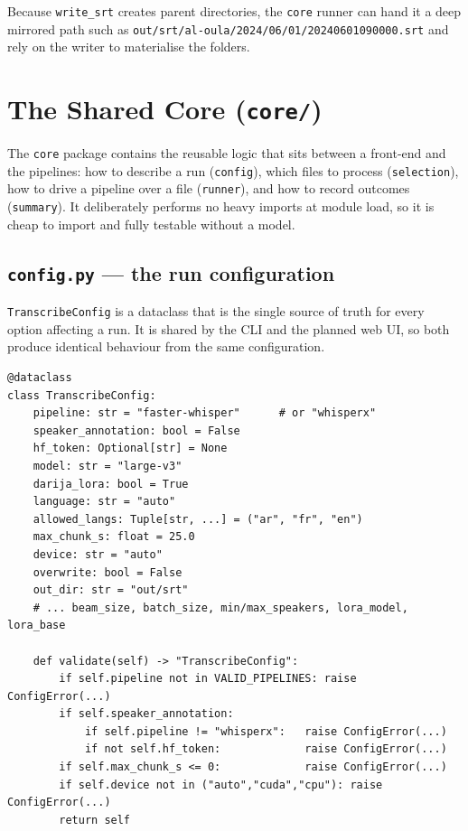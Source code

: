 \documentclass[11pt,a4paper]{report}
\newcommand{\code}[1]{\texttt{\small #1}}
\begin{document}
Because \code{write\_srt} creates parent directories, the \texttt{core} runner can
hand it a deep mirrored path such as
\code{out/srt/al-oula/2024/06/01/20240601090000.srt} and rely on the writer to
materialise the folders.

\chapter{The Shared Core (\texttt{core/})}
\label{ch:core}

The \texttt{core} package contains the reusable logic that sits between a
front-end and the pipelines: how to describe a run (\code{config}), which files to
process (\code{selection}), how to drive a pipeline over a file
(\code{runner}), and how to record outcomes (\code{summary}). It deliberately
performs no heavy imports at module load, so it is cheap to import and fully
testable without a model.

\section{\texttt{config.py} --- the run configuration}

\code{TranscribeConfig} is a dataclass that is the single source of truth for
every option affecting a run. It is shared by the CLI and the planned web UI, so
both produce identical behaviour from the same configuration.

\begin{lstlisting}[caption={Selected \texttt{TranscribeConfig} fields and validation.}]
@dataclass
class TranscribeConfig:
    pipeline: str = "faster-whisper"      # or "whisperx"
    speaker_annotation: bool = False
    hf_token: Optional[str] = None
    model: str = "large-v3"
    darija_lora: bool = True
    language: str = "auto"
    allowed_langs: Tuple[str, ...] = ("ar", "fr", "en")
    max_chunk_s: float = 25.0
    device: str = "auto"
    overwrite: bool = False
    out_dir: str = "out/srt"
    # ... beam_size, batch_size, min/max_speakers, lora_model, lora_base

    def validate(self) -> "TranscribeConfig":
        if self.pipeline not in VALID_PIPELINES: raise ConfigError(...)
        if self.speaker_annotation:
            if self.pipeline != "whisperx":   raise ConfigError(...)
            if not self.hf_token:             raise ConfigError(...)
        if self.max_chunk_s <= 0:             raise ConfigError(...)
        if self.device not in ("auto","cuda","cpu"): raise ConfigError(...)
        return self
\end{lstlisting}
\end{document}
